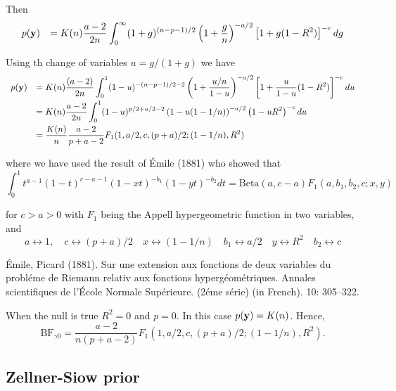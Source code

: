 \documentclass{article}[12pt]
\newcommand{\joc}[1]{{\color{red}#1}}
\begin{document}
\noindent Then
$$
\begin{array}{rl}
p({\bf y}) 
& \displaystyle = K(n) \frac{a - 2}{2n}  \int_0^\infty 
(1 + g)^{(n-p-1)/2} \left(1 + \frac{g}{n}\right)^{-a/2} \left[ 1 + g (1 - R^2) \right]^{-c}  dg
\end{array} 
$$


\noindent Using th change of variables $u = g/(1 + g)$ we have
$$
\begin{array}{rl}
p({\bf y}) 
& \displaystyle = K(n) \frac{(a - 2)}{2n}  \int_0^1 
(1 - u)^{-(n-p-1)/2 - 2} \left(1 +  \frac{u/n}{1-u} \right)^{-a/2} \left[ 1 + \frac{u}{1-u} (1 - R^2) \right]^{-c} du
\\ [2ex]
& \displaystyle = K(n) \frac{a - 2}{2n}  \int_0^1 
(1 - u)^{p/2 + a/2 - 2  } \left(1 - u (1  -  1/n) \right)^{-a/2} \left(  1 - u R^2\right)^{-c} du
\\ [2ex]
& \displaystyle = \frac{K(n)}{n} \frac{a - 2}{p + a - 2}  F_1(1,a/2,c,(p + a)/2; (1  -  1/n), R^2) 
\end{array} 
$$

\noindent where we have used the result of \'Emile (1881) who showed that
$$
\int_0^1 t^{a-1} (1-t)^{c-a-1} (1-xt)^{-b_1} (1-yt)^{-b_2} dt
= \mbox{Beta}(a,c - a) F_1(a,b_1,b_2,c; x,y) 
$$

\noindent for $c>a>0$  with
$F_1$ being the Appell hypergeometric function in two variables, and
$$
a\leftrightarrow 1,
\quad 
c  \leftrightarrow (p + a)/2 
\quad 
x \leftrightarrow (1  -  1/n)
\quad 
b_1 \leftrightarrow a/2
\quad 
y \leftrightarrow R^2
\quad 
b_2 \leftrightarrow c
$$


\'Emile, Picard  (1881). Sur une extension aux fonctions de deux variables du probl\'eme de Riemann relativ aux fonctions hyperg\'eom\'etriques. Annales scientifiques de l'\'Ecole Normale Sup\'erieure. (2\'eme s\'erie) (in French). 10: 305--322.


\bigskip 
\noindent When the null is true $R^2 = 0$ and $p=0$. In this case $p({\bf y}) =  K(n)$. Hence,
$$
\mbox{BF}_{\gamma 0} = \frac{a - 2}{n(p + a - 2)}  F_1(1,a/2,c,(p + a)/2; (1  -  1/n), R^2) .
$$

\newpage 
\subsection*{Zellner-Siow prior}
\end{document}

